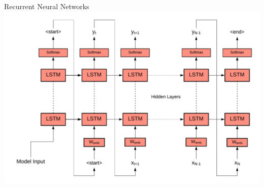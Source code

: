 \documentclass{beamer}
\begin{document}
\begin{frame}{Recurrent Neural Networks}
    \includegraphics[scale=0.5]{nets/rnn.png}
\end{frame}
\end{document}
